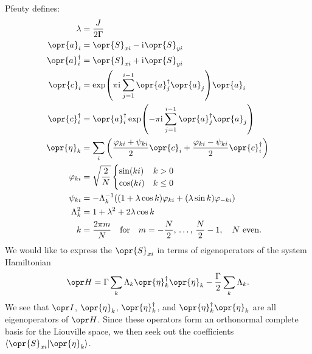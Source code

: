 \documentclass[../thesis.tex]{subfiles}
\begin{document}
Pfeuty defines:
\begin{align}
  \lambda
  &= \frac{J}{2\Gamma}
  \label{eq:pflambda} \\
  \opr{a}_i
  &= \opr{S}_{xi} - \im\opr{S}_{yi} 
  \label{eq:pfa} \\
  \opr{a}_i^\dag
  &= \opr{S}_{xi} + \im\opr{S}_{yi} 
  \label{eq:pfadag} \\
  \opr{c}_i
  &= \exp(\pi\im\sum_{j=1}^{i-1} \opr{a}_j^\dag\opr{a}_j)\opr{a}_i
  \label{eq:pfc} \\
  \opr{c}_i^\dag
  &= \opr{a}_i^\dag\exp(-\pi\im\sum_{j=1}^{i-1} \opr{a}_j^\dag\opr{a}_j)
  \label{eq:pfcdag} \\
  \opr{\eta}_k
  &= \sum_i \qty(\frac{\varphi_{ki} + \psi_{ki}}{2}\opr{c}_i
  + \frac{\varphi_{ki} - \psi_{ki}}{2}\opr{c}_i^\dag)
  \label{eq:pfeta} \\
  \varphi_{ki}
  &= \sqrt{\frac{2}{N}}\begin{cases}
    \sin(ki) & k > 0 \\
    \cos(ki) & k \leq 0
  \end{cases}
  \label{eq:pfphi} \\
  \psi_{ki}
  &= -\Lambda_k^{-1} \qty((1 + \lambda\cos k)\varphi_{ki}
  + (\lambda\sin k)\varphi_{-ki})
  \label{eq:pfpsi} \\
  \Lambda_k^2
  &= 1 + \lambda^2 + 2\lambda\cos k
  \label{eq:pfLambda} \\
  k
  &= \frac{2\pi m}{N} \qfor m = -\frac{N}{2},\, \ldots,\, \frac{N}{2} - 1,
  \qq{$N$ even.}
  \label{eq:pfk}
\end{align}
We would like to express the $\opr{S}_{xi}$ in terms of eigenoperators of the
system Hamiltonian
\begin{equation}
  \ham
  = \Gamma\sum_k \Lambda_k \opr{\eta}_k^\dag\opr{\eta}_k
  - \frac{\Gamma}{2}\sum_k \Lambda_k.
  \label{eq:pfH}
\end{equation}
We see that $\idopr$, $\opr{\eta}_k$, $\opr{\eta}_k^\dag$, and
$\opr{\eta}_k^\dag\opr{\eta}_k$ are all eigenoperators of $\ham$. Since these
operators form an orthonormal complete basis for the Liouville space, we then
seek out the coefficients $\ip{\opr{S}_{xi}}{\opr{\eta}_k}$.
\end{document}
